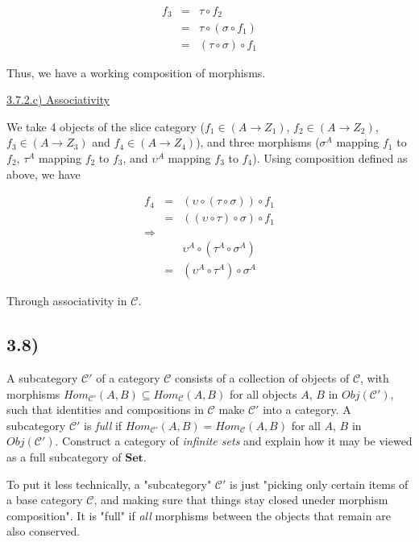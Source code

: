 \documentclass[12pt, letterpaper, twoside]{report}
\begin{document}
$$
\begin{aligned}
	f_3 &=&  \tau \circ                f_2  \\
		&=&  \tau \circ (\sigma  \circ f_1) \\
		&=& (\tau \circ  \sigma) \circ f_1
\end{aligned}
$$

Thus, we have a working composition of morphisms.

\vspace{5mm}
\underline{3.7.2.c) Associativity}

We take 4 objects of the slice category ($f_1 \in (A \to Z_1)$, $f_2 \in (A \to Z_2)$, $f_3 \in (A \to Z_3)$ and  $f_4 \in (A \to Z_4)$), and three morphisms ($\sigma^A$ mapping $f_1$ to $f_2$, $\tau^A$ mapping $f_2$ to $f_3$, and $\upsilon^A$ mapping $f_3$ to $f_4$). Using composition defined as above, we have

$$
\begin{aligned}
f_4 &=& ( \upsilon \circ (\tau  \circ \sigma)) \circ f_1 \\
	&=& ((\upsilon \circ  \tau) \circ \sigma ) \circ f_1 \\
\Rightarrow && \\
    & &  \upsilon^A \circ (\tau^A  \circ \sigma^A) \\
    &=& (\upsilon^A \circ  \tau^A) \circ \sigma^A
\end{aligned}
$$

Through associativity in $\mathcal{C}$.


\subsection*{3.8)}

A subcategory $\mathcal{C'}$ of a category $\mathcal{C}$ consists of a collection of objects of $\mathcal{C}$, with morphisms $Hom_\mathcal{C'} (A, B) \subseteq Hom_\mathcal{C} (A, B)$ for all objects $A$, $B$ in $Obj(\mathcal{C'})$, such that identities and compositions in $\mathcal{C}$ make $\mathcal{C'}$ into a category. A subcategory $\mathcal{C'}$ is \textit{full} if $Hom_\mathcal{C'} (A, B) = Hom_\mathcal{C} (A, B)$ for all $A$, $B$ in $Obj(\mathcal{C'})$. Construct a category of \textit{infinite sets} and explain how it may be viewed as a full subcategory of $\mathbf{Set}$.

To put it less technically, a "subcategory" $\mathcal{C'}$ is just "picking only certain items of a base category $\mathcal{C}$, and making sure that things stay closed uneder morphism composition". It is "full" if \textit{all} morphisms between the objects that remain are also conserved.
\end{document}
